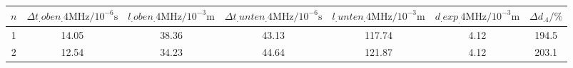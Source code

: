 \label{tab:tabAScan4}
	\begin{tabular}{S[table-format=1.0]S[table-format=2.2]S[table-format=2.2]S[table-format=2.2]S[table-format=2.2]S[table-format=2.2]S[table-format=2.1]}
		\toprule
		{$n$} & {$\Delta t_.{oben_.{4\si{\mega\hertz} } }/10^{-6}\si{\second}$} & {$l_.{oben_.{4\si{\mega\hertz} } }/10^{-3}\si{\metre}$} & {$\Delta t_.{unten_.{4\si{\mega\hertz} } }/10^{-6}\si{\second}$} & {$l_.{unten_.{4\si{\mega\hertz} } }/10^{-3}\si{\metre}$} & {$d_.{exp_.{4\si{\mega\hertz} } }/10^{-3}\si{\metre}$} & {$\Delta d_.4/\%$} \\
		 & 14.05 & 38.36 & 43.13 & 117.74 & 4.12 & 194.5 \\
		2 & 12.54 & 34.23 & 44.64 & 121.87 & 4.12 & 203.1 \\
		\bottomrule
	\end{tabular}
